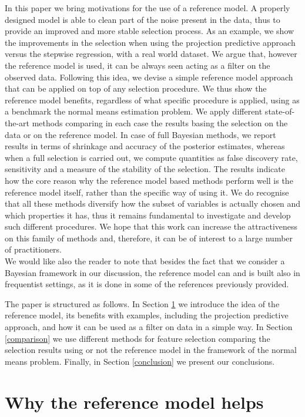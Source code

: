 \documentclass[american,]{article}
\theoremstyle{definition}
\begin{document}
In this paper we bring motivations for the use of a reference model. A properly designed model is able to clean part of the noise present in the data, thus to provide an improved and more stable selection process. As an example, we show the improvements in the selection when using the projection predictive approach versus the stepwise regression, with a real world dataset. We argue that, however the reference model is used, it can be always seen acting as a filter on the observed data. Following this idea, we devise a simple reference model approach that can be applied on top of any selection procedure. We thus show the reference model benefits, regardless of what specific procedure is applied, using as a benchmark the normal means estimation problem. We apply different state-of-the-art methods comparing in each case the results basing the selection on the data or on the reference model. In case of full Bayesian methods, we report results in terms of shrinkage and accuracy of the posterior estimates, whereas when a full selection is carried out, we compute quantities as false discovery rate, sensitivity and a measure of the stability of the selection. The results indicate how the core reason why the reference model based methods perform well is the reference model itself, rather than the specific way of using it. We do recognise that all these methods diversify how the subset of variables is actually chosen and which properties it has, thus it remains fundamental to investigate and develop such different procedures. We hope that this work can increase the attractiveness on this family of methods and, therefore, it can be of interest to a large number of practitioners.
\\
We would like also the reader to note that besides the fact that we consider a Bayesian framework in our discussion, the reference model can and is built also in frequentist settings, as it is done in some of the references previously provided.

The paper is structured as follows. In Section \ref{reference-model-approach} we introduce the idea of the reference model, its benefits with examples, including the projection predictive approach, and how it can be used as a filter on data in a simple way. In Section \ref{comparison} we use different methods for feature selection comparing the selection results using or not the reference model in the framework of the normal means problem. Finally, in Section \ref{conclusion} we present our conclusions.

\hypertarget{reference-model-approach}{%
\section{Why the reference model helps}\label{reference-model-approach}}
\end{document}
